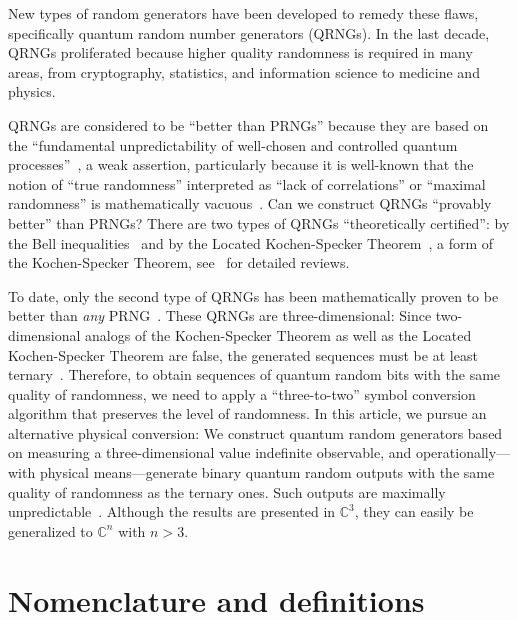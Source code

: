\documentclass[%
 superscriptaddress,
  preprint,
 showpacs,
 showkeys,
 nofootinbib,
  amsmath,amssymb,
  aps,
 pra,
  longbibliography,
  floatfix,
 ]{revtex4-2}
\theoremstyle{definition}
\begin{document}
New types of random generators have been developed to remedy these flaws, specifically quantum random number generators (QRNGs).
In the last decade, QRNGs proliferated because higher quality randomness is required in many areas, from cryptography,
statistics, and information science to medicine and physics.

QRNGs are considered to be ``better than PRNGs'' because they are based on the
``fundamental unpredictability of well-chosen and controlled quantum processes''~\cite{Quantis2020},
a weak assertion, particularly because it is well-known that the notion of ``true randomness''
interpreted as ``lack of correlations'' or ``maximal randomness'' is mathematically vacuous~\cite{calude:02}.
Can we construct QRNGs ``provably better'' than PRNGs? There are two types of QRNGs ``theoretically certified'':
by  the Bell inequalities~\cite{10.1038/nature09008,NonakaMyriam2022Tros,Hayashi:2022aa}
and by the Located Kochen-Specker Theorem~\cite{2012-incomput-proofsCJ,2015-AnalyticKS},
a form of the Kochen-Specker Theorem, see~\cite{kochen1,Landsman2020,cabello2021contextuality} for detailed reviews.

To date, only the second type of QRNGs has been mathematically proven to be better than \textit{any} PRNG~\cite{2012-incomput-proofsCJ,aguero_trejo_new_2021,RSPA23}.
These QRNGs are three-dimensional:
Since two-dimensional analogs of the Kochen-Specker Theorem as well as the Located Kochen-Specker Theorem are false,
the generated sequences must be at least ternary~\cite{svozil-2009-howto}.
Therefore, to obtain sequences of quantum random bits with the same quality of randomness, we need to apply a ``three-to-two'' symbol conversion algorithm that preserves the level of randomness.
In this article, we pursue an alternative physical conversion:
We construct quantum random generators based on measuring a three-dimensional value indefinite observable,
and operationally---with physical means---generate binary quantum random outputs with the same quality of randomness as the ternary ones.
Such outputs are maximally unpredictable~\cite{2014-nobit}.
Although the results are presented in $\mathbb{C}^3$, they can easily be generalized to $\mathbb{C}^n$ with $n>3$.




\section{Nomenclature and definitions}
\label{2023-viext-defs}
\end{document}
